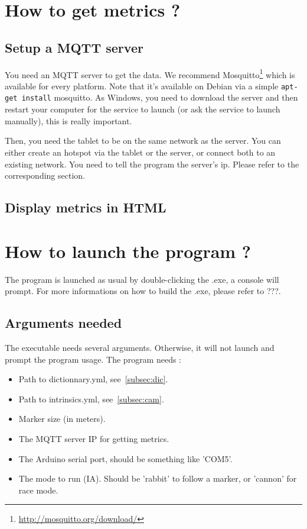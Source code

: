 \documentclass[a4paper,11pt]{report}
\begin{document}
\section{How to get metrics ?}

\subsection{Setup a MQTT server}

You need an MQTT server to get the data. We recommend
Mosquitto\footnote{\url{http://mosquitto.org/download/}} which is available for every
platform.  Note that it's available on Debian via a simple \texttt{apt-get install}
mosquitto. As Windows, you need to download the server and then restart your
computer for the service to launch (or ask the service to launch manually),
this is really important.

Then, you need the tablet to be on the same network as the server. You can
either create an hotspot via the tablet or the server, or connect both to an
existing network.  You need to tell the program the server's ip. Please refer
to the corresponding section.

\subsection{Display metrics in HTML}


\section{How to launch the program ?}

The program is launched as usual by double-clicking the .exe, a console will
prompt. 
For more informations on how to build the .exe, please refer to ???.

\subsection{Arguments needed}

The executable needs several arguments. Otherwise, it will not launch and
prompt the program usage.
The program needs :

\begin{itemize}
    \item Path to dictionnary.yml, see~\ref{subsec:dic}.
    \item Path to intrinsics.yml, see~\ref{subsec:cam}.
    \item Marker size (in meters).
    \item The MQTT server IP for getting metrics.
    \item The Arduino serial port, should be something like 'COM5'.
    \item The mode to run (IA). Should be 'rabbit' to follow a marker, or 'cannon' for race mode.
\end{itemize}
\end{document}
